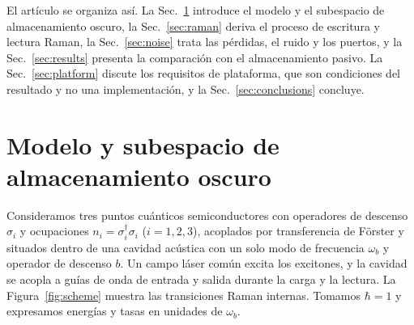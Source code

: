 \documentclass[aps,pra,twocolumn,groupedaddress,amsmath,amssymb,floatfix]{revtex4-2}
\newcommand{\wb}{\omega_b}
\begin{document}
El art\'iculo se organiza as\'i. La Sec.~\ref{sec:model} introduce el modelo y el subespacio de almacenamiento oscuro, la Sec.~\ref{sec:raman} deriva el proceso de escritura y lectura Raman, la Sec.~\ref{sec:noise} trata las p\'erdidas, el ruido y los puertos, y la Sec.~\ref{sec:results} presenta la comparaci\'on con el almacenamiento pasivo. La Sec.~\ref{sec:platform} discute los requisitos de plataforma, que son condiciones del resultado y no una implementaci\'on, y la Sec.~\ref{sec:conclusions} concluye.

\section{Modelo y subespacio de almacenamiento oscuro}
\label{sec:model}

Consideramos tres puntos cu\'anticos semiconductores con operadores de descenso $\sigma_i$ y ocupaciones $n_i=\sigma_i^\dagger\sigma_i$ ($i=1,2,3$), acoplados por transferencia de F\"orster y situados dentro de una cavidad ac\'ustica con un solo modo de frecuencia $\wb$ y operador de descenso $b$. Un campo l\'aser com\'un excita los excitones, y la cavidad se acopla a gu\'ias de onda de entrada y salida durante la carga y la lectura. La Figura~\ref{fig:scheme} muestra las transiciones Raman internas. Tomamos $\hbar=1$ y expresamos energ\'ias y tasas en unidades de $\wb$.
\end{document}
